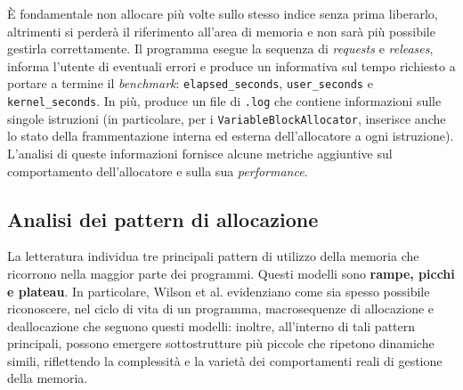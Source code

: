 È fondamentale non allocare più volte sullo stesso indice senza prima liberarlo, altrimenti si perderà il riferimento all'area di memoria e non sarà più possibile gestirla correttamente\footnotemark. Il programma esegue la sequenza di \textit{requests} e \textit{releases}, informa l'utente di eventuali errori e produce un informativa sul tempo richiesto a portare a termine il \textit{benchmark}: \texttt{elapsed\_seconds}, \texttt{user\_seconds} e \texttt{kernel\_seconds}. In più, produce un file di \texttt{.log} che contiene informazioni sulle singole istruzioni (in particolare, per i \texttt{VariableBlockAllocator}, inserisce anche lo stato della frammentazione interna ed esterna dell'allocatore a ogni istruzione).
L'analisi di queste informazioni fornisce alcune metriche aggiuntive sul comportamento dell'allocatore e sulla sua \textit{performance}.


\subsection{Analisi dei pattern di allocazione}
La letteratura individua tre principali pattern di utilizzo della memoria che ricorrono nella maggior parte dei programmi. Questi modelli sono \textbf{rampe, picchi e plateau}\footnotemark. In particolare, Wilson et al. evidenziano come sia spesso possibile riconoscere, nel ciclo di vita di un programma, macrosequenze di allocazione e deallocazione che seguono questi modelli: inoltre, all'interno di tali pattern principali, possono emergere sottostrutture più piccole che ripetono dinamiche simili, riflettendo la complessità e la varietà dei comportamenti reali di gestione della memoria.



